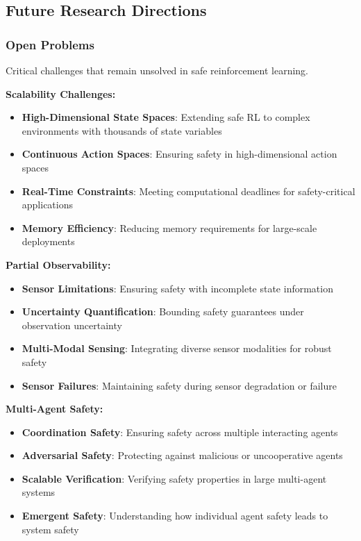 \documentclass[12pt]{article}
\begin{document}
{{{{\subsection{Future Research Directions}

\subsubsection{Open Problems}

Critical challenges that remain unsolved in safe reinforcement learning.

\textbf{Scalability Challenges:}
\begin{itemize}
\item \textbf{High-Dimensional State Spaces}: Extending safe RL to complex environments with thousands of state variables
\item \textbf{Continuous Action Spaces}: Ensuring safety in high-dimensional action spaces
\item \textbf{Real-Time Constraints}: Meeting computational deadlines for safety-critical applications
\item \textbf{Memory Efficiency}: Reducing memory requirements for large-scale deployments
\end{itemize}

\textbf{Partial Observability:}
\begin{itemize}
\item \textbf{Sensor Limitations}: Ensuring safety with incomplete state information
\item \textbf{Uncertainty Quantification}: Bounding safety guarantees under observation uncertainty
\item \textbf{Multi-Modal Sensing}: Integrating diverse sensor modalities for robust safety
\item \textbf{Sensor Failures}: Maintaining safety during sensor degradation or failure
\end{itemize}

\textbf{Multi-Agent Safety:}
\begin{itemize}
\item \textbf{Coordination Safety}: Ensuring safety across multiple interacting agents
\item \textbf{Adversarial Safety}: Protecting against malicious or uncooperative agents
\item \textbf{Scalable Verification}: Verifying safety properties in large multi-agent systems
\item \textbf{Emergent Safety}: Understanding how individual agent safety leads to system safety
\end{itemize}

}}}}
\end{document}
